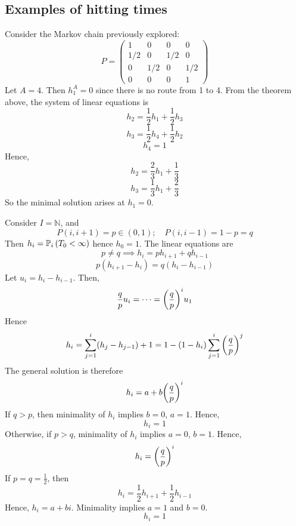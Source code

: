 \subsection{Examples of hitting times}
\begin{example}
	Consider the Markov chain previously explored:
	\[
		P = \begin{pmatrix}
			1   & 0   & 0   & 0   \\
			1/2 & 0   & 1/2 & 0   \\
			0   & 1/2 & 0   & 1/2 \\
			0   & 0   & 0   & 1
		\end{pmatrix}
	\]
	Let \( A = \qty{4} \).
	Then \( h_1^A = 0 \) since there is no route from 1 to 4.
	From the theorem above, the system of linear equations is
	\[
		h_2 = \frac{1}{2} h_1 + \frac{1}{2} h_3
	\]
	\[
		h_3 = \frac{1}{2} h_4 + \frac{1}{2} h_2
	\]
	\[
		h_4 = 1
	\]
	Hence,
	\[
		h_2 = \frac{2}{3} h_1 + \frac{1}{3}
	\]
	\[
		h_3 = \frac{1}{3} h_1 + \frac{2}{3}
	\]
	So the minimal solution arises at \( h_1 = 0 \).
\end{example}
\begin{example}
	Consider \( I = \mathbb N \), and
	\[
		P(i, i+1) = p \in (0,1);\quad P(i, i-1) = 1-p = q
	\]
	Then \( h_i = \mathbb{P}_{i}\left({T_0 < \infty}\right) \) hence \( h_0 = 1 \).
	The linear equations are
	\[
		p \neq q \implies h_i = p h_{i+1} + q h_{i-1}
	\]
	\[
		p(h_{i+1} - h_i) = q(h_i - h_{i-1})
	\]
	Let \( u_i = h_i - h_{i-1} \).
	Then,
	\[
		\frac{q}{p} u_i = \dots = \qty(\frac{q}{p})^i u_1
	\]
	Hence
	\[
		h_i = \sum_{j=1}^i (h_j - h_{j-1}) + 1 = 1 - (1-h_i) \sum_{j=1}^i \qty(\frac{q}{p})^j
	\]
	The general solution is therefore
	\[
		h_i = a + b \qty(\frac{q}{p})^i
	\]
	If \( q > p \), then minimality of \( h_i \) implies \( b = 0 \), \( a = 1 \).
	Hence,
	\[
		h_i = 1
	\]
	Otherwise, if \( p > q \), minimality of \( h_i \) implies \( a = 0 \), \( b = 1 \).
	Hence,
	\[
		h_i = \qty(\frac{q}{p})^i
	\]
	If \( p = q = \frac{1}{2} \), then
	\[
		h_i = \frac{1}{2} h_{i+1} + \frac{1}{2} h_{i-1}
	\]
	Hence, \( h_i = a + bi \).
	Minimality implies \( a = 1 \) and \( b = 0 \).
	\[
		h_i = 1
	\]
\end{example}

